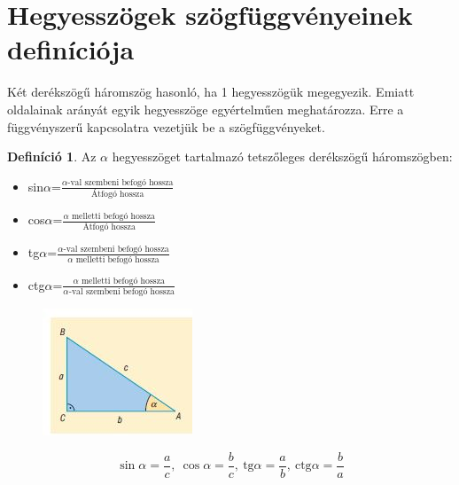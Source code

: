 \documentclass[twoside,12pt]{report}
\theoremstyle{definition}
\newtheorem{definition}[theorem]{Definíció}
\begin{document}
\section{Hegyesszögek szögfüggvényeinek definíciója}
	Két derékszögű háromszög hasonló, ha 1 hegyesszögük megegyezik. Emiatt oldalainak arányát egyik hegyesszöge egyértelműen meghatározza. Erre a függvényszerű kapcsolatra vezetjük be a szögfüggvényeket.
	\begin{definition}
		Az $\alpha$ hegyesszöget tartalmazó tetszőleges derékszögű háromszögben:
		\begin{itemize}
			\item sin$\alpha$=$\frac{\alpha\text{-val szembeni befogó hossza}}{\text{Átfogó hossza}}$
			\item cos$\alpha$=$\frac{\alpha\text{ melletti befogó hossza}}{\text{Átfogó hossza}}$
			\item tg$\alpha$=$\frac{\alpha\text{-val szembeni befogó hossza}}{\alpha\text{ melletti befogó hossza}}$
			\item ctg$\alpha$=$\frac{\alpha\text{ melletti befogó hossza}}{\alpha\text{-val szembeni befogó hossza}}$
		\end{itemize}
		\begin{figure}[H]
			\centering
			\includegraphics[width=0.4\linewidth]{Derékszög}
		\end{figure}
		\begin{equation*}
			\sin\alpha=\frac{a}{c},\ \cos\alpha=\frac{b}{c},\ \text{tg}\alpha=\frac{a}{b},\ \text{ctg}\alpha=\frac{b}{a}
		\end{equation*}
	\end{definition}
\end{document}
